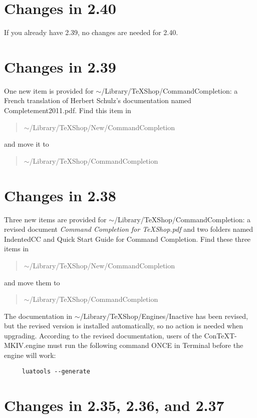 \documentclass[11pt, oneside]{amsart}
\begin{document}
\section{Changes in 2.40}

If you already have 2.39, no changes are needed for 2.40.

\section{Changes in 2.39}

One new item is provided for 
	$\sim$/Library/TeXShop/CommandCompletion: a French translation of Herbert Schulz's documentation  named
	Completement2011.pdf.
Find this item in
\begin{quotation} 
$\sim$/Library/TeXShop/New/CommandCompletion
\end{quotation}
 and move it to 
 \begin{quotation}
 $\sim$/Library/TeXShop/CommandCompletion
 \end{quotation}


\section{Changes in 2.38}

Three new items are provided for $\sim$/Library/TeXShop/CommandCompletion: a revised document {\em Command Completion for TeXShop.pdf}
and two folders named IndentedCC and Quick Start Guide for Command Completion. Find these three items in
\begin{quotation} 
$\sim$/Library/TeXShop/New/CommandCompletion
\end{quotation}
 and move them to 
 \begin{quotation}
 $\sim$/Library/TeXShop/CommandCompletion
 \end{quotation}

The documentation in $\sim$/Library/TeXShop/Engines/Inactive has been revised, but the revised version is installed automatically, so no action
is needed when upgrading. According to the revised documentation, users of the ConTeXT-MKIV.engine must run the following
command ONCE in Terminal before the engine will work:
\begin{verbatim}
     luatools --generate
\end{verbatim}


\section{Changes in 2.35, 2.36, and 2.37}
\end{document}

